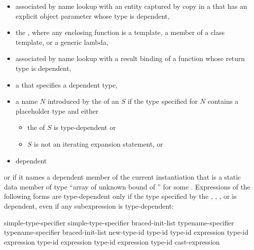 \begin{itemize}
\begin{example}
\begin{codeblock}
int main() {
  f<int>();
}
\end{codeblock}
\end{example}
\item
associated by name lookup with
an entity captured by copy
in a 
that has an explicit object parameter whose type is dependent,
\item
the
, where any enclosing function is a
template, a member of a class template, or a generic lambda,
\item
associated by name lookup
with a result binding of a function
whose return type is dependent,
\item
a  that specifies a dependent type,
\item
a name $N$ introduced by the 
of an  $S$
if the type specified for $N$ contains a placeholder type and either
\begin{itemize}
\item the  of $S$ is type-dependent or
\item $S$ is not an iterating expansion statement, or
\end{itemize}
\item
dependent
\end{itemize}
or if it names a dependent member of the current instantiation that is a static
data member of type
``array of unknown bound of '' for some .
Expressions of the following forms are type-dependent only if the type
specified by the
,
,
,
or
is dependent, even if any subexpression is type-dependent:

\begin{ncsimplebnf}
simple-type-specifier \terminal{(}  \terminal{)}\br
simple-type-specifier braced-init-list\br
typename-specifier \terminal{(}  \terminal{)}\br
typename-specifier braced-init-list\br
\opt{\terminal{::}}   new-type-id \br
\opt{\terminal{::}}   \terminal{(} type-id \terminal{)} \br
{} \terminal{<} type-id \terminal{>} \terminal{(} expression \terminal{)}\br
{} \terminal{<} type-id \terminal{>} \terminal{(} expression \terminal{)}\br
{} \terminal{<} type-id \terminal{>} \terminal{(} expression \terminal{)}\br
{} \terminal{<} type-id \terminal{>} \terminal{(} expression \terminal{)}\br
\terminal{(} type-id \terminal{)} cast-expression
\end{ncsimplebnf}

